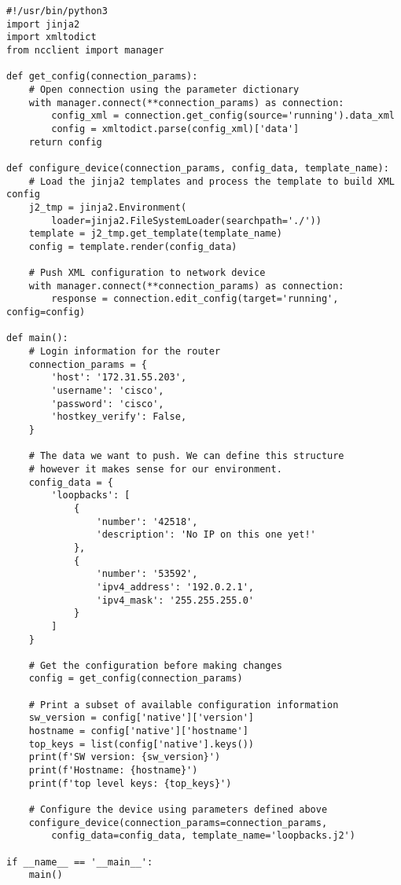 \begin{verbatim}
#!/usr/bin/python3
import jinja2
import xmltodict
from ncclient import manager

def get_config(connection_params):
    # Open connection using the parameter dictionary
    with manager.connect(**connection_params) as connection:
        config_xml = connection.get_config(source='running').data_xml
        config = xmltodict.parse(config_xml)['data']
    return config

def configure_device(connection_params, config_data, template_name):
    # Load the jinja2 templates and process the template to build XML config
    j2_tmp = jinja2.Environment(
        loader=jinja2.FileSystemLoader(searchpath='./'))
    template = j2_tmp.get_template(template_name)
    config = template.render(config_data)

    # Push XML configuration to network device
    with manager.connect(**connection_params) as connection:
        response = connection.edit_config(target='running', config=config)

def main():
    # Login information for the router
    connection_params = {
        'host': '172.31.55.203',
        'username': 'cisco',
        'password': 'cisco',
        'hostkey_verify': False,
    }

    # The data we want to push. We can define this structure
    # however it makes sense for our environment.
    config_data = {
        'loopbacks': [
            {
                'number': '42518',
                'description': 'No IP on this one yet!'
            },
            {
                'number': '53592',
                'ipv4_address': '192.0.2.1',
                'ipv4_mask': '255.255.255.0'
            }
        ]
    }

    # Get the configuration before making changes
    config = get_config(connection_params)

    # Print a subset of available configuration information
    sw_version = config['native']['version']
    hostname = config['native']['hostname']
    top_keys = list(config['native'].keys())
    print(f'SW version: {sw_version}')
    print(f'Hostname: {hostname}')
    print(f'top level keys: {top_keys}')

    # Configure the device using parameters defined above
    configure_device(connection_params=connection_params,
        config_data=config_data, template_name='loopbacks.j2')

if __name__ == '__main__':
    main()
\end{verbatim}

